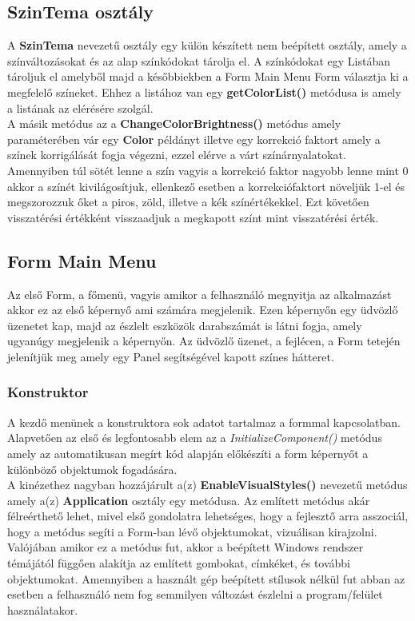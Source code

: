 \documentclass[tocnopagenum]{thesis-ekf}
\theoremstyle{definition}
\theoremstyle{remark}
\begin{document}
	\subsection{SzinTema osztály}
	A \textbf{SzinTema} nevezetű osztály egy külön készített nem beépített osztály, amely a színváltozásokat és az alap színkódokat tárolja el.
	A színkódokat egy Listában tároljuk el amelyből majd a későbbiekben a Form Main Menu Form választja ki a megfelelő színeket. Ehhez a listához van egy \textbf{getColorList()} metódusa is amely a listának az elérésére szolgál. 
	\\
	A másik metódus az a \textbf{ChangeColorBrightness()} metódus amely paraméterében vár egy \textbf{Color} példányt illetve egy korrekció faktort amely a színek korrigálását fogja végezni, ezzel elérve a várt színárnyalatokat. Amennyiben túl sötét lenne a szín vagyis a korrekció faktor nagyobb lenne mint 0 akkor a színét kivilágosítjuk, ellenkező esetben a korrekciófaktort növeljük 1-el és megszorozzuk őket a piros, zöld, illetve a kék színértékekkel. Ezt követően visszatérési értékként visszaadjuk a megkapott színt mint visszatérési érték. 
	\subsection{Form Main Menu}
	\label{FormMainmenu}
	Az első Form, a főmenü, vagyis amikor a felhasználó megnyitja az alkalmazást akkor ez az első képernyő ami számára megjelenik. 
	Ezen képernyőn egy üdvözlő üzenetet kap, majd az észlelt eszközök darabszámát is látni fogja, amely ugyanúgy megjelenik a képernyőn.
	Az üdvözlő üzenet, a fejlécen, a Form tetején jelenítjük meg amely egy Panel segítségével kapott színes hátteret.
	\subsubsection{Konstruktor}
	A kezdő menünek a konstruktora sok adatot tartalmaz a formmal kapcsolatban. Alapvetően az első és legfontosabb elem az a \textit{InitializeComponent()} metódus amely az automatikusan megírt kód alapján előkészíti a form képernyőt a különböző objektumok fogadására.
	\\
	 A kinézethez nagyban hozzájárult a(z) \textbf{EnableVisualStyles()} nevezetű metódus amely a(z) \textbf{Application} osztály egy metódusa. Az említett metódus akár félreérthető lehet, mivel első gondolatra lehetséges, hogy a fejlesztő arra asszociál, hogy a metódus segíti a Form-ban lévő objektumokat, vizuálisan kirajzolni. Valójában amikor ez a metódus fut, akkor a beépített Windows rendszer témájától függően alakítja az említett gombokat, címkéket, és további objektumokat. Amennyiben a használt gép beépített stílusok nélkül fut abban az esetben a felhasználó nem fog semmilyen változást észlelni a program/felület használatakor.
\end{document}

